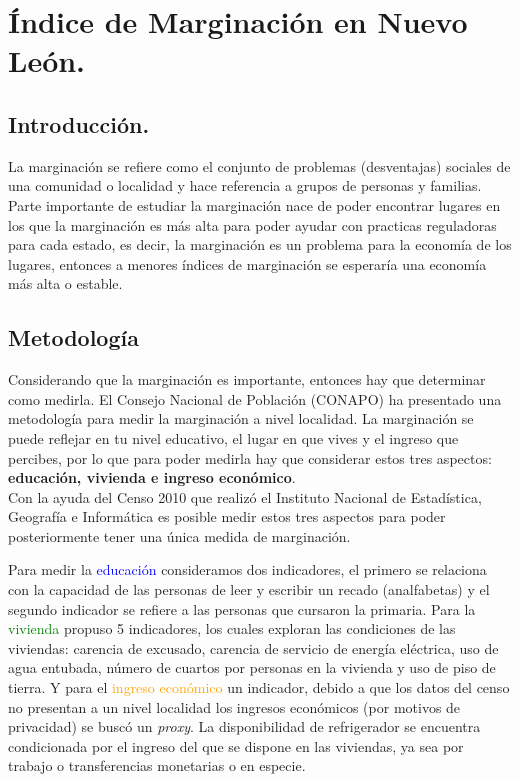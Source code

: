 \documentclass[paper=letter, fontsize=11pt]{scrartcl}
\numberwithin{equation}{section} %
\numberwithin{figure}{section} %
\numberwithin{table}{section} %
\begin{document}
\section{Índice de Marginación en Nuevo León.}
\subsection{Introducción.}
La marginación se refiere como el conjunto de problemas (desventajas) sociales de una comunidad o localidad y hace referencia a grupos de personas y familias. Parte importante de estudiar la marginación nace de poder encontrar lugares en los que la marginación es más alta para poder ayudar con practicas reguladoras para cada estado, es decir, la marginación es un problema para la economía de los lugares, entonces a menores índices de marginación se esperaría una economía más alta o estable. \\

\subsection{Metodología}
Considerando que la marginación es importante, entonces hay que determinar como medirla. El Consejo Nacional de Población (CONAPO) ha presentado una metodología para medir la marginación a nivel localidad. La marginación se puede reflejar en tu nivel educativo, el lugar en que vives y el ingreso que percibes, por lo que para poder medirla hay que considerar estos tres aspectos: \textbf{educación, vivienda e ingreso económico}.\\

Con la ayuda del Censo 2010 que realizó el Instituto Nacional de Estadística, Geografía e Informática es posible medir estos tres aspectos para poder posteriormente tener una única medida de marginación.

Para medir la \textcolor{blue}{educación} consideramos dos indicadores, el primero se relaciona con la capacidad de las personas de leer y escribir un recado (analfabetas) y el segundo indicador se refiere a las personas que cursaron la primaria. Para la \textcolor{green}{vivienda} propuso 5 indicadores,  los cuales exploran las condiciones de las viviendas: carencia de excusado, carencia de servicio de energía eléctrica, uso de agua entubada, número de cuartos por personas en la vivienda y uso de piso de tierra. Y para el \textcolor{orange}{ingreso económico} un indicador, debido a que los datos del censo no presentan a un nivel localidad los ingresos económicos (por motivos de privacidad) se buscó un \textit{proxy}. La disponibilidad de refrigerador se encuentra condicionada por el ingreso del que se dispone en las viviendas, ya sea por trabajo o transferencias monetarias o en especie. \\
\end{document}
